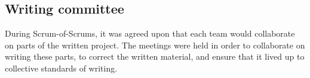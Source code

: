 \subsection{Writing committee}
During Scrum-of-Scrums, it was agreed upon that each team would collaborate on parts of the written project. The meetings were held in order to collaborate on writing these parts, to correct the written material, and ensure that it lived up to collective standards of writing.


